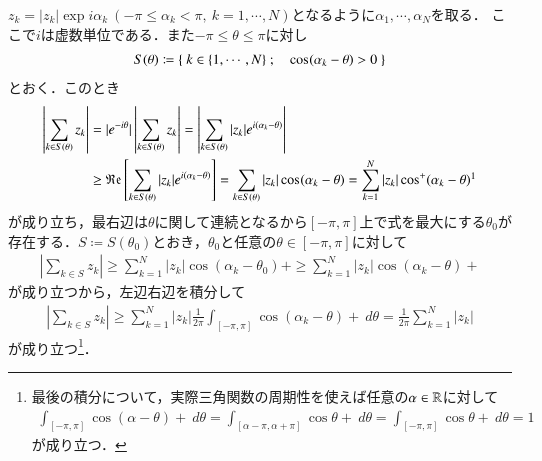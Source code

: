 	\begin{prf}[補題]
		$z_k = |z_k|\exp{i \alpha_k}\ (-\pi \leq \alpha_k < \pi,\ k=1,\cdots,N)$となるように$\alpha_1,\cdots,\alpha_N$を取る．
		ここで$i$は虚数単位である．また$-\pi \leq \theta \leq \pi$に対し
		\begin{align}
			S(\theta) \coloneqq \left\{\ k \in \{1,\cdots,N\}\ ;\quad \operatorname{cos}^{} (\alpha_k - \theta) > 0\ \right\}
		\end{align}
		とおく．このとき
		\begin{align}
			\left| \sum_{k \in S(\theta)} z_k \right| &= |\exp{-i\theta}|\left| \sum_{k \in S(\theta)} z_k \right| = \left| \sum_{k \in S(\theta)} |z_k|\exp{i(\alpha_k - \theta)} \right| \\
			&\geq \Re{\sum_{k \in S(\theta)} |z_k|\exp{i(\alpha_k - \theta)}} = \sum_{k \in S(\theta)} |z_k| \cos{(\alpha_k - \theta)}{} = \sum_{k=1}^{N} |z_k| \cos{(\alpha_k - \theta)}{+}
			\footnotemark
		\end{align}
		が成り立ち，最右辺は$\theta$に関して連続となるから$[-\pi,\pi]$上で式を最大にする$\theta_0$が存在する．$S \coloneqq S(\theta_0)$とおき，$\theta_0$と任意の$\theta \in [-\pi,\pi]$に対して
		\begin{align}
			\left| \sum_{k \in S} z_k \right| \geq \sum_{k=1}^{N} |z_k| \cos{(\alpha_k - \theta_0)}{+} \geq \sum_{k=1}^{N} |z_k| \cos{(\alpha_k - \theta)}{+}
		\end{align}
		が成り立つから，左辺右辺を積分して
		\begin{align}
			\left| \sum_{k \in S} z_k \right| \geq \sum_{k=1}^{N} |z_k| \frac{1}{2\pi} \int_{[-\pi,\pi]} \cos{(\alpha_k - \theta)}{+}\ d\theta
			= \frac{1}{2\pi} \sum_{k=1}^{N} |z_k|
		\end{align}
		が成り立つ\footnote{
			最後の積分について，実際三角関数の周期性を使えば任意の$\alpha \in \mathbb{R}$に対して
			\begin{align}
				\int_{[-\pi,\pi]} \cos{(\alpha - \theta)}{+}\ d\theta = \int_{[\alpha-\pi,\alpha+\pi]} \cos{\theta}{+}\ d\theta = \int_{[-\pi,\pi]} \cos{\theta}{+}\ d\theta = 1
			\end{align}
			が成り立つ．
		}．
		\QED
	\end{prf}
	
